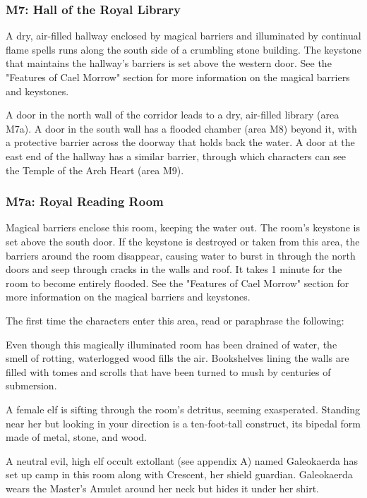 \documentclass[10pt,a4paper,twoside,twocolumn,openany,nodeprecatedcode]{dndbook}
\begin{document}
\subsubsection{M7: Hall of the Royal Library}
A dry, air-filled hallway enclosed by magical barriers and illuminated by continual flame spells runs along the south side of a crumbling stone building. The keystone that maintains the hallway's barriers is set above the western door. See the "Features of Cael Morrow" section for more information on the magical barriers and keystones.

A door in the north wall of the corridor leads to a dry, air-filled library (area M7a). A door in the south wall has a flooded chamber (area M8) beyond it, with a protective barrier across the doorway that holds back the water. A door at the east end of the hallway has a similar barrier, through which characters can see the Temple of the Arch Heart (area M9).

\subsubsection{M7a: Royal Reading Room}
Magical barriers enclose this room, keeping the water out. The room's keystone is set above the south door. If the keystone is destroyed or taken from this area, the barriers around the room disappear, causing water to burst in through the north doors and seep through cracks in the walls and roof. It takes 1 minute for the room to become entirely flooded. See the "Features of Cael Morrow" section for more information on the magical barriers and keystones.

The first time the characters enter this area, read or paraphrase the following:

\begin{DndReadAloud}{}
Even though this magically illuminated room has been drained of water, the smell of rotting, waterlogged wood fills the air. Bookshelves lining the walls are filled with tomes and scrolls that have been turned to mush by centuries of submersion.

A female elf is sifting through the room's detritus, seeming exasperated. Standing near her but looking in your direction is a ten-foot-tall construct, its bipedal form made of metal, stone, and wood.

\end{DndReadAloud}

A neutral evil, high elf occult extollant (see appendix A) named Galeokaerda has set up camp in this room along with Crescent, her shield guardian. Galeokaerda wears the Master's Amulet around her neck but hides it under her shirt.
\end{document}
